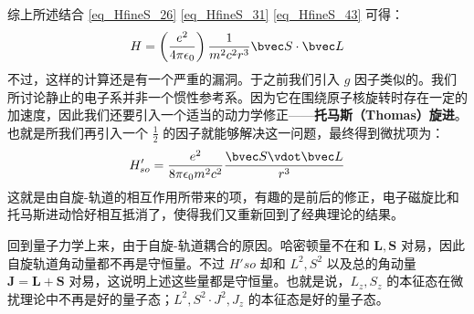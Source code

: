 综上所述结合 \autoref{eq_HfineS_26} \autoref{eq_HfineS_31} \autoref{eq_HfineS_43} 可得：
\begin{equation}
H=\left(\frac{e^2}{4\pi\epsilon_0}\right)\frac{1}{m^2c^2r^3}\bvec S \cdot \bvec L
\end{equation}
不过，这样的计算还是有一个严重的漏洞。于之前我们引入 $g$ 因子类似的。我们所讨论静止的电子系并非一个惯性参考系。因为它在围绕原子核旋转时存在一定的加速度，因此我们还要引入一个适当的动力学修正——\textbf{托马斯（Thomas）旋进}。也就是所我们再引入一个 $\frac{1}{2}$ 的因子就能够解决这一问题，最终得到微扰项为：
\begin{equation}
H'_{so} = \frac{e^2}{8\pi \epsilon_0 m^2 c^2} \frac{\bvec S \vdot \bvec L}{r^3}
\end{equation}
这就是由自旋-轨道的相互作用所带来的项，有趣的是前后的修正，电子磁旋比和托马斯进动恰好相互抵消了，使得我们又重新回到了经典理论的结果。

回到量子力学上来，由于自旋-轨道耦合的原因。哈密顿量不在和 $\mathbf{L,S}$ 对易，因此自旋轨道角动量都不再是守恒量。不过 $H'{so}$ 却和 $L^2,S^2$ 以及总的角动量 $\mathbf{J=L+S}$ 对易，这说明上述这些量都是守恒量。也就是说，$L_z,S_z$ 的本征态在微扰理论中不再是好的量子态；$L^2,S^2\cdot J^2,J_z$ 的本征态是好的量子态。

